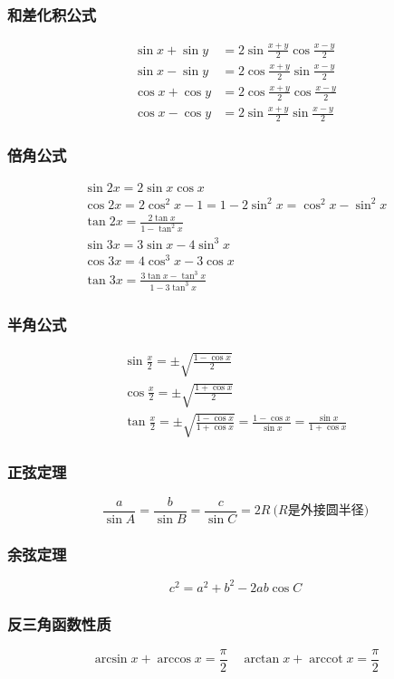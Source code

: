 \documentclass[a4paper,zihao=-4,UTF8]{ctexbook}
\begin{document}
\subsubsection{和差化积公式}
\begin{align*}
\sin x+\sin y&=2\sin\frac{x+y}{2}\cos\frac{x-y}{2}\\
\sin x-\sin y&=2\cos\frac{x+y}{2}\sin\frac{x-y}{2}\\
\cos x+\cos y&=2\cos\frac{x+y}{2}\cos\frac{x-y}{2}\\
\cos x-\cos y&=2\sin\frac{x+y}{2}\sin\frac{x-y}{2}
\end{align*}
\subsubsection{倍角公式}
\begin{gather*}
\sin 2x=2\sin x\cos x\\
\cos 2x=2\cos^2 x-1=1-2\sin^2 x=\cos^2 x-\sin^2 x\\
\tan 2x=\frac{2\tan x}{1-\tan^2 x}\\
\sin 3x=3\sin x-4\sin^3 x\\
\cos 3x=4\cos^3 x-3\cos x\\
\tan 3x=\frac{3\tan x-\tan^3 x}{1-3\tan^3 x}
\end{gather*}
\subsubsection{半角公式}
\begin{gather*}
    \sin\frac x2=\pm\sqrt{\frac{1-\cos x}{2}}\\
\cos\frac x2=\pm\sqrt{\frac{1+\cos x}{2}}\\
\tan\frac x2=\pm\sqrt{\frac{1-\cos x}{1+\cos x}}=\frac{1-\cos x}{\sin x}=\frac{\sin x}{1+\cos x}
\end{gather*}
\subsubsection{正弦定理}
\[\frac{a}{\sin A}=\frac{b}{\sin B}=\frac{c}{\sin C}=2R\ \text{($R$是外接圆半径)}\]
\subsubsection{余弦定理}
\[c^2=a^2+b^2-2ab\cos C\]
\subsubsection{反三角函数性质}
\[\arcsin x+\arccos x=\frac \pi2 \quad \arctan x+\operatorname{arccot} x=\frac \pi2\]
\end{document}
